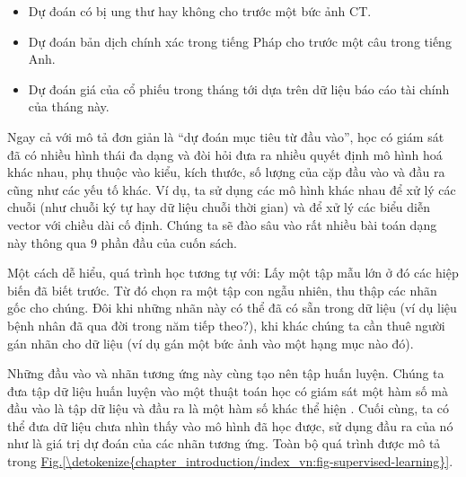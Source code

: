 \documentclass[letterpaper,11pt,english]{sphinxmanual}
\begin{document}
\begin{itemize}
\item {} 
Dự đoán có bị ung thư hay không cho trước một bức ảnh CT.

\item {} 
Dự đoán bản dịch chính xác trong tiếng Pháp cho trước một câu trong
tiếng Anh.

\item {} 
Dự đoán giá của cổ phiếu trong tháng tới dựa trên dữ liệu báo cáo tài
chính của tháng này.

\end{itemize}







Ngay cả với mô tả đơn giản là “dự đoán mục tiêu từ đầu vào”, học có giám
sát đã có nhiều hình thái đa dạng và đòi hỏi đưa ra nhiều quyết định mô
hình hoá khác nhau, phụ thuộc vào kiểu, kích thước, số lượng của cặp đầu
vào và đầu ra cũng như các yếu tố khác. Ví dụ, ta sử dụng các mô hình
khác nhau để xử lý các chuỗi (như chuỗi ký tự hay dữ liệu chuỗi thời
gian) và để xử lý các biểu diễn vector với chiều dài cố định. Chúng ta
sẽ đào sâu vào rất nhiều bài toán dạng này thông qua 9 phần đầu của cuốn
sách.



Một cách dễ hiểu, quá trình học tương tự với: Lấy một tập mẫu lớn ở đó
các hiệp biến đã biết trước. Từ đó chọn ra một tập con ngẫu nhiên, thu
thập các nhãn gốc cho chúng. Đôi khi những nhãn này có thể đã có sẵn
trong dữ liệu (ví dụ liệu bệnh nhân đã qua đời trong năm tiếp theo?),
khi khác chúng ta cần thuê người gán nhãn cho dữ liệu (ví dụ gán một bức
ảnh vào một hạng mục nào đó).



Những đầu vào và nhãn tương ứng này cùng tạo nên tập huấn luyện. Chúng
ta đưa tập dữ liệu huấn luyện vào một thuật toán học có giám sát \textendash{} một
hàm số mà đầu vào là tập dữ liệu và đầu ra là một hàm số khác thể hiện
. Cuối cùng, ta có thể đưa dữ liệu chưa nhìn thấy
vào mô hình đã học được, sử dụng đầu ra của nó như là giá trị dự đoán
của các nhãn tương ứng. Toàn bộ quá trình được mô tả trong
\hyperref[\detokenize{chapter_introduction/index_vn:fig-supervised-learning}]{Fig.\@ \ref{\detokenize{chapter_introduction/index_vn:fig-supervised-learning}}}.
\end{document}
